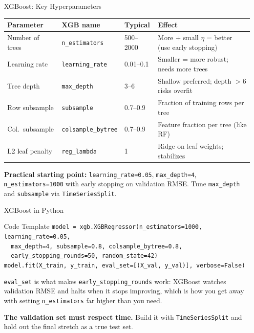 \documentclass[aspectratio=169, 11pt]{beamer}
\begin{document}
\begin{frame}{XGBoost: Key Hyperparameters}
  \begin{center}
    {\footnotesize
    \begin{tabular}{p{2.6cm}p{2.8cm}p{1.8cm}p{4.0cm}}
      \toprule
      \textbf{Parameter} & \textbf{XGB name} & \textbf{Typical} & \textbf{Effect} \\
      \midrule
      Number of trees & \texttt{n\_estimators} & 500--2000 & More + small $\eta$ = better (use early stopping) \\
      Learning rate & \texttt{learning\_rate} & 0.01--0.1 & Smaller = more robust; needs more trees \\
      Tree depth & \texttt{max\_depth} & 3--6 & Shallow preferred; depth $>$6 risks overfit \\
      Row subsample & \texttt{subsample} & 0.7--0.9 & Fraction of training rows per tree \\
      Col.\ subsample & \texttt{colsample\_bytree} & 0.7--0.9 & Feature fraction per tree (like RF) \\
      L2 leaf penalty & \texttt{reg\_lambda} & 1 & Ridge on leaf weights; stabilizes \\
      \bottomrule
    \end{tabular}
    }
  \end{center}
  \begin{keybox}
    \small \textbf{Practical starting point:}
    \texttt{learning\_rate=0.05}, \texttt{max\_depth=4},
    \texttt{n\_estimators=1000} with early stopping on validation RMSE.
    Tune \texttt{max\_depth} and \texttt{subsample} via \texttt{TimeSeriesSplit}.
  \end{keybox}
\end{frame}

\begin{frame}{XGBoost in Python}
  \begin{examplebox}{Code Template}
    {\scriptsize
    \texttt{model = xgb.XGBRegressor(n\_estimators=1000, learning\_rate=0.05,}\\
    \texttt{\mbox{}\ \ max\_depth=4, subsample=0.8, colsample\_bytree=0.8,}\\
    \texttt{\mbox{}\ \ early\_stopping\_rounds=50, random\_state=42)}\\
    \texttt{model.fit(X\_train, y\_train, eval\_set=[(X\_val, y\_val)], verbose=False)}
    }
  \end{examplebox}
  \texttt{eval\_set} is what makes \texttt{early\_stopping\_rounds} work: XGBoost watches
  validation RMSE and halts when it stops improving, which is how you get away with setting
  \texttt{n\_estimators} far higher than you need.

  \textbf{The validation set must respect time.} Build it with \texttt{TimeSeriesSplit} and
  hold out the final stretch as a true test set.

\end{frame}
\end{document}
